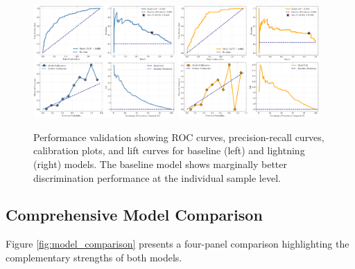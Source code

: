\documentclass[11pt,a4paper]{article}
\begin{document}
\begin{figure}[H]
\centering
\includegraphics[width=0.48\textwidth]{../output/figures/validation_performance_baseline.png}
\hfill
\includegraphics[width=0.48\textwidth]{../output/figures/validation_performance_lightning.png}
\caption{Performance validation showing ROC curves, precision-recall curves, calibration plots, and lift curves for baseline (left) and lightning (right) models. The baseline model shows marginally better discrimination performance at the individual sample level.}
\label{fig:performance_validation}
\end{figure}

\subsection{Comprehensive Model Comparison}

Figure \ref{fig:model_comparison} presents a four-panel comparison highlighting the complementary strengths of both models.
\end{document}
